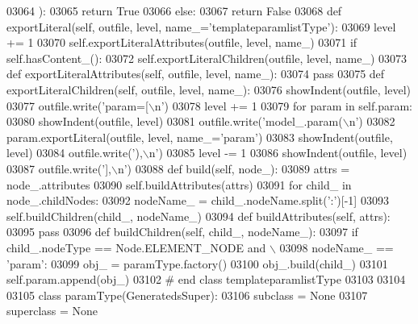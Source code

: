 \begin{DoxyCode}
{{{{{{{{{{{{{{{{{{{{{{{{{{{{{{{{{{{{{{{{{{{{{{{{{{{{{{{{{{{{{{{{{{{{{{{{{{{{{{{{{{{{{{{{{{{{{{{{{{{{{{{{{{{{{{{{{{{{{{{{{{{{{{{{{{{{{{{{{{{{{{{{{{{{{{{{{{{{{{{{{{{{{{{{{{{{{{{{{{{{{{{{{{{{{{{{{{{{{{{{{{{{{03064             ):
03065             \textcolor{keywordflow}{return} \textcolor{keyword}{True}
03066         \textcolor{keywordflow}{else}:
03067             \textcolor{keywordflow}{return} \textcolor{keyword}{False}
03068     \textcolor{keyword}{def }exportLiteral(self, outfile, level, name\_='templateparamlistType'):
03069         level += 1
03070         self.exportLiteralAttributes(outfile, level, name\_)
03071         \textcolor{keywordflow}{if} self.hasContent_():
03072             self.exportLiteralChildren(outfile, level, name\_)
03073     \textcolor{keyword}{def }exportLiteralAttributes(self, outfile, level, name\_):
03074         \textcolor{keywordflow}{pass}
03075     \textcolor{keyword}{def }exportLiteralChildren(self, outfile, level, name\_):
03076         showIndent(outfile, level)
03077         outfile.write(\textcolor{stringliteral}{'param=[\(\backslash\)n'})
03078         level += 1
03079         \textcolor{keywordflow}{for} param \textcolor{keywordflow}{in} self.param:
03080             showIndent(outfile, level)
03081             outfile.write(\textcolor{stringliteral}{'model\_.param(\(\backslash\)n'})
03082             param.exportLiteral(outfile, level, name\_=\textcolor{stringliteral}{'param'})
03083             showIndent(outfile, level)
03084             outfile.write(\textcolor{stringliteral}{'),\(\backslash\)n'})
03085         level -= 1
03086         showIndent(outfile, level)
03087         outfile.write(\textcolor{stringliteral}{'],\(\backslash\)n'})
03088     \textcolor{keyword}{def }build(self, node\_):
03089         attrs = node\_.attributes
03090         self.buildAttributes(attrs)
03091         \textcolor{keywordflow}{for} child\_ \textcolor{keywordflow}{in} node\_.childNodes:
03092             nodeName\_ = child\_.nodeName.split(\textcolor{stringliteral}{':'})[-1]
03093             self.buildChildren(child\_, nodeName\_)
03094     \textcolor{keyword}{def }buildAttributes(self, attrs):
03095         \textcolor{keywordflow}{pass}
03096     \textcolor{keyword}{def }buildChildren(self, child\_, nodeName\_):
03097         \textcolor{keywordflow}{if} child\_.nodeType == Node.ELEMENT\_NODE \textcolor{keywordflow}{and} \(\backslash\)
03098             nodeName\_ == \textcolor{stringliteral}{'param'}:
03099             obj\_ = paramType.factory()
03100             obj\_.build(child\_)
03101             self.param.append(obj\_)
03102 \textcolor{comment}{# end class templateparamlistType}
03103 
03104 
03105 \textcolor{keyword}{class }paramType(GeneratedsSuper):
03106     subclass = \textcolor{keywordtype}{None}
03107     superclass = \textcolor{keywordtype}{None}
}}}}}}}}}}}}}}}}}}}}}}}}}}}}}}}}}}}}}}}}}}}}}}}}}}}}}}}}}}}}}}}}}}}}}}}}}}}}}}}}}}}}}}}}}}}}}}}}}}}}}}}}}}}}}}}}}}}}}}}}}}}}}}}}}}}}}}}}}}}}}}}}}}}}}}}}}}}}}}}}}}}}}}}}}}}}}}}}}}}}}}}}}}}}}}}}}}}}}}}}}}}}}
\end{DoxyCode}
